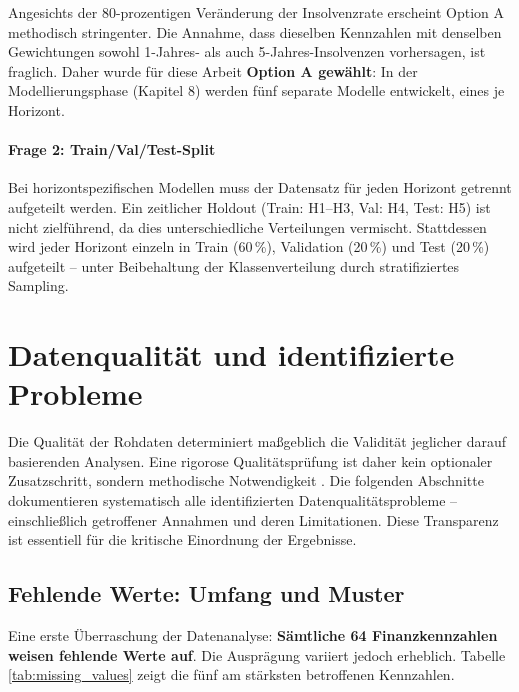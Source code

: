 Angesichts der 80-prozentigen Veränderung der Insolvenzrate erscheint Option A methodisch stringenter. Die Annahme, dass dieselben Kennzahlen mit denselben Gewichtungen sowohl 1-Jahres- als auch 5-Jahres-Insolvenzen vorhersagen, ist fraglich. Daher wurde für diese Arbeit \textbf{Option A gewählt}: In der Modellierungsphase (Kapitel 8) werden fünf separate Modelle entwickelt, eines je Horizont.

\paragraph{Frage 2: Train/Val/Test-Split}

Bei horizontspezifischen Modellen muss der Datensatz für jeden Horizont getrennt aufgeteilt werden. Ein zeitlicher Holdout (Train: H1--H3, Val: H4, Test: H5) ist nicht zielführend, da dies unterschiedliche Verteilungen vermischt. Stattdessen wird jeder Horizont einzeln in Train (60\,\%), Validation (20\,\%) und Test (20\,\%) aufgeteilt – unter Beibehaltung der Klassenverteilung durch stratifiziertes Sampling.

\section{Datenqualität und identifizierte Probleme}

Die Qualität der Rohdaten determiniert maßgeblich die Validität jeglicher darauf basierenden Analysen. Eine rigorose Qualitätsprüfung ist daher kein optionaler Zusatzschritt, sondern methodische Notwendigkeit \parencite{goodfellow2016deep}. Die folgenden Abschnitte dokumentieren systematisch alle identifizierten Datenqualitätsprobleme – einschließlich getroffener Annahmen und deren Limitationen. Diese Transparenz ist essentiell für die kritische Einordnung der Ergebnisse.

\subsection{Fehlende Werte: Umfang und Muster}

Eine erste Überraschung der Datenanalyse: \textbf{Sämtliche 64 Finanzkennzahlen weisen fehlende Werte auf}. Die Ausprägung variiert jedoch erheblich. Tabelle \ref{tab:missing_values} zeigt die fünf am stärksten betroffenen Kennzahlen.

